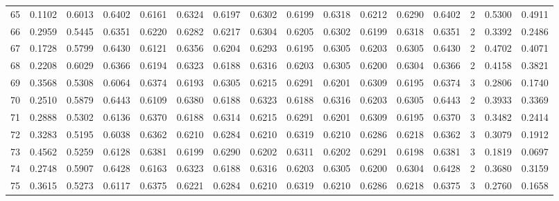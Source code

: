 \begin{tabular}{lrrrrrrrrrrrrrrr}
65  &      0.1102 &  0.6013 &  0.6402 &  0.6161 &  0.6324 &  0.6197 &  0.6302 &  0.6199 &  0.6318 &  0.6212 &   0.6290 &     0.6402 &      2 &                    0.5300 &                     0.4911 \\
66  &      0.2959 &  0.5445 &  0.6351 &  0.6220 &  0.6282 &  0.6217 &  0.6304 &  0.6205 &  0.6302 &  0.6199 &   0.6318 &     0.6351 &      2 &                    0.3392 &                     0.2486 \\
67  &      0.1728 &  0.5799 &  0.6430 &  0.6121 &  0.6356 &  0.6204 &  0.6293 &  0.6195 &  0.6305 &  0.6203 &   0.6305 &     0.6430 &      2 &                    0.4702 &                     0.4071 \\
68  &      0.2208 &  0.6029 &  0.6366 &  0.6194 &  0.6323 &  0.6188 &  0.6316 &  0.6203 &  0.6305 &  0.6200 &   0.6304 &     0.6366 &      2 &                    0.4158 &                     0.3821 \\
69  &      0.3568 &  0.5308 &  0.6064 &  0.6374 &  0.6193 &  0.6305 &  0.6215 &  0.6291 &  0.6201 &  0.6309 &   0.6195 &     0.6374 &      3 &                    0.2806 &                     0.1740 \\
70  &      0.2510 &  0.5879 &  0.6443 &  0.6109 &  0.6380 &  0.6188 &  0.6323 &  0.6188 &  0.6316 &  0.6203 &   0.6305 &     0.6443 &      2 &                    0.3933 &                     0.3369 \\
71  &      0.2888 &  0.5302 &  0.6136 &  0.6370 &  0.6188 &  0.6314 &  0.6215 &  0.6291 &  0.6201 &  0.6309 &   0.6195 &     0.6370 &      3 &                    0.3482 &                     0.2414 \\
72  &      0.3283 &  0.5195 &  0.6038 &  0.6362 &  0.6210 &  0.6284 &  0.6210 &  0.6319 &  0.6210 &  0.6286 &   0.6218 &     0.6362 &      3 &                    0.3079 &                     0.1912 \\
73  &      0.4562 &  0.5259 &  0.6128 &  0.6381 &  0.6199 &  0.6290 &  0.6202 &  0.6311 &  0.6202 &  0.6291 &   0.6198 &     0.6381 &      3 &                    0.1819 &                     0.0697 \\
74  &      0.2748 &  0.5907 &  0.6428 &  0.6163 &  0.6323 &  0.6188 &  0.6316 &  0.6203 &  0.6305 &  0.6200 &   0.6304 &     0.6428 &      2 &                    0.3680 &                     0.3159 \\
75  &      0.3615 &  0.5273 &  0.6117 &  0.6375 &  0.6221 &  0.6284 &  0.6210 &  0.6319 &  0.6210 &  0.6286 &   0.6218 &     0.6375 &      3 &                    0.2760 &                     0.1658 \\

\end{tabular}
